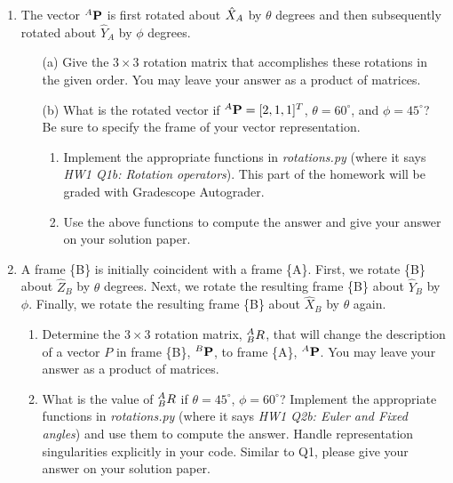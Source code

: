\begin{enumerate}

\item 
The vector $^{A}{\bf P}$ is first rotated about $\hat{X}_{A}$ by $\theta$ degrees and then subsequently rotated about $\hat{Y}_{A}$ by $\phi$ degrees.

\begin{enumerate}
  \item[(a)]
  Give the $3 \times 3$ rotation matrix that accomplishes these rotations in the given order. You may leave your answer as a product of matrices. 

\vspace{5cm}


  \item[(b)]
  What is the rotated vector if $^{A}{\bf P} = [2,1,1]^T$, $\theta = 60^\circ$, and $\phi = 45^\circ$? Be sure to specify the frame of your vector representation.
  \begin{enumerate}
  \item 
  Implement the appropriate functions in  \textit{rotations.py} (where it says \textit{HW1 Q1b: Rotation operators}). This part of the homework will be graded with Gradescope Autograder.
  \item Use the above functions to compute the answer and give your answer on your solution paper.
  \end{enumerate}


\vspace{6cm}


\end{enumerate}
\vspace{1ex}

\item
A frame \{B\} is initially coincident with a frame \{A\}. First, we rotate \{B\} about $\hat{Z}_{B}$ by $\theta$ degrees. Next, we rotate the resulting frame \{B\} about $\hat{Y}_{B}$ by $\phi$. Finally, we rotate the resulting frame \{B\} about $\hat{X}_{B}$ by $\theta$ again.
\begin{enumerate}[label=(\alph*)]
  \item
   Determine the $3 \times 3$ rotation matrix, $^{A}_{B}R$, that will change the description of a vector $P$ in frame \{B\}, $^{B}{\bf P}$, to frame \{A\}, $^{A}{\bf P}$. You may leave your answer as a product of matrices. 
   
  
\vspace{6cm}
  \item
What is the value of $^{A}_{B}R$ if $\theta = 45^\circ$, $\phi = 60^\circ$? Implement the appropriate functions in \textit{rotations.py} (where it says \textit{HW1 Q2b: Euler and Fixed angles}) and use them to compute the answer. Handle representation singularities explicitly in your code. Similar to Q1, please give your answer on your solution paper.


\end{enumerate}
\end{enumerate}
